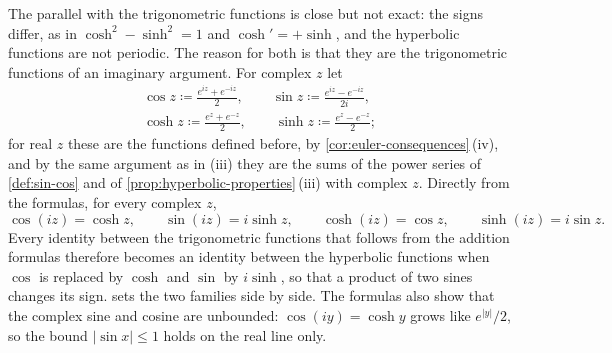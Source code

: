 The parallel with the trigonometric functions is close but not exact: the signs differ, as in $\cosh^2-\sinh^2=1$ and $\cosh'=+\sinh$, and the hyperbolic functions are not periodic. The reason for both is that they are the trigonometric functions of an imaginary argument. For complex $z$ let
\begin{gather*}
\cos z\coloneqq\frac{e^{iz}+e^{-iz}}2,\qquad\sin z\coloneqq\frac{e^{iz}-e^{-iz}}{2i},\\
\cosh z\coloneqq\frac{e^z+e^{-z}}2,\qquad\sinh z\coloneqq\frac{e^z-e^{-z}}2;
\end{gather*}
for real $z$ these are the functions defined before, by \cref{cor:euler-consequences}\,(iv), and by the same argument as in (iii) they are the sums of the power series of \cref{def:sin-cos} and of \cref{prop:hyperbolic-properties}\,(iii) with complex $z$. Directly from the formulas, for every complex $z$,
\[
\cos(iz)=\cosh z,\qquad\sin(iz)=i\sinh z,\qquad\cosh(iz)=\cos z,\qquad\sinh(iz)=i\sin z .
\]
Every identity between the trigonometric functions that follows from the addition formulas therefore becomes an identity between the hyperbolic functions when $\cos$ is replaced by $\cosh$ and $\sin$ by $i\sinh$, so that a product of two sines changes its sign.  sets the two families side by side. The formulas also show that the complex sine and cosine are unbounded: $\cos(iy)=\cosh y$ grows like $e^{|y|}/2$, so the bound $|\sin x|\le1$ holds on the real line only.

\begin{table}
\end{table}

